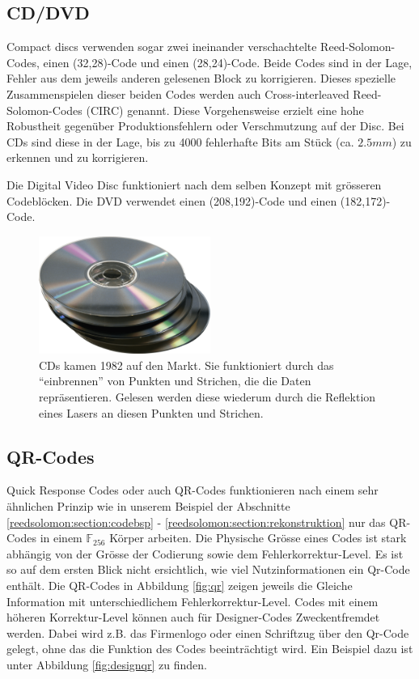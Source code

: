 \subsection{CD/DVD}
Compact discs verwenden sogar zwei ineinander verschachtelte Reed-Solomon-Codes, einen (32,28)-Code und einen (28,24)-Code.
Beide Codes sind in der Lage, Fehler aus dem jeweils anderen gelesenen Block zu korrigieren. Dieses spezielle Zusammenspielen dieser beiden Codes werden auch Cross-interleaved Reed-Solomon-Codes (CIRC) genannt.
Diese Vorgehensweise erzielt eine hohe Robustheit gegenüber Produktionsfehlern oder Verschmutzung auf der Disc. Bei CDs sind diese in der Lage, bis zu 4000 fehlerhafte Bits am Stück (ca. $2.5mm$) zu erkennen und zu korrigieren. 

Die Digital Video Disc funktioniert nach dem selben Konzept mit grösseren Codeblöcken. Die DVD verwendet einen (208,192)-Code und einen (182,172)-Code.


\begin{figure}
	\centering
	\includegraphics[width=0.5\textwidth]{papers/reedsolomon/images/Compact_Disc}
	\caption{CDs kamen 1982 auf den Markt. Sie funktioniert durch das ``einbrennen'' von Punkten und Strichen, die die Daten repräsentieren. Gelesen werden diese wiederum durch die Reflektion eines Lasers an diesen Punkten und Strichen.}
	\label{fig:cd}
\end{figure}

\subsection{QR-Codes}
Quick Response Codes oder auch QR-Codes funktionieren nach einem sehr ähnlichen Prinzip wie in unserem Beispiel der Abschnitte \ref{reedsolomon:section:codebsp} - \ref{reedsolomon:section:rekonstruktion} nur das QR-Codes in einem $\mathbb{F}_{256}$ Körper arbeiten. Die Physische Grösse eines Codes ist stark abhängig von der Grösse der Codierung sowie dem Fehlerkorrektur-Level. Es ist so auf dem ersten Blick nicht ersichtlich, wie viel Nutzinformationen ein Qr-Code enthält. Die QR-Codes in Abbildung \ref{fig:qr} zeigen jeweils die Gleiche Information mit unterschiedlichem Fehlerkorrektur-Level. Codes mit einem höheren Korrektur-Level können auch für Designer-Codes Zweckentfremdet werden. Dabei wird z.B. das Firmenlogo oder einen Schriftzug über den Qr-Code gelegt, ohne das die Funktion des Codes beeinträchtigt wird. Ein Beispiel dazu ist unter Abbildung \ref{fig:designqr} zu finden. 

